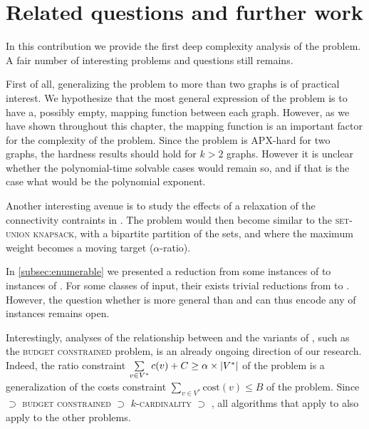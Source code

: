 	\section{Related questions and further work}

		In this contribution we provide the first deep complexity analysis of the \mwccs{} problem.
		A fair number of interesting problems and questions still remains.

		First of all, generalizing the problem to more than two graphs is of practical interest.
		We hypothesize that the most general expression of the problem is to have a, possibly empty, mapping function between each graph.
		However, as we have shown throughout this chapter, the mapping function is an important factor for the complexity of the problem.
		Since the \mwccs{} problem is APX-hard for two graphs, the hardness results should hold for $k > 2$ graphs.
		However it is unclear whether the polynomial-time solvable cases would remain so, and if that is the case what would be the polynomial exponent.

		Another interesting avenue is to study the effects of a relaxation of the connectivity contraints in \mwccs{}.
		The problem would then become similar to the \textsc{set-union knapsack}, with a bipartite partition of the sets, and where the maximum weight becomes a moving target ($\alpha$-ratio).

		In \cref{subsec:enumerable} we presented a reduction from some instances of \mwccs{} to instances of \rbmwcs{}.
		For some classes of input, their exists trivial reductions from \rbmwcs{} to \mwccs{}.
		However, the question whether \mwccs{} is more general than \rbmwcs{} and can thus encode any of \rbmwcs{} instances remains open.

		Interestingly, analyses of the relationship between \rbmwcs{} and the variants of \mwcs{}, such as the \textsc{budget constrained} problem, is an already ongoing direction of our research.
		Indeed, the ratio constraint $\sum\limits_{v \in V^*}{c(v)} + C \geq \alpha\times\lvert V^*\rvert$ of the \rbmwcs{} problem is a generalization of the costs constraint $\sum\limits_{v \in V^*}{\text{cost}(v)} \leq B$ of the \bcmwcs{} problem. %
		Since \rbmwcs{} $\supset$ \textsc{budget constrained \mwcs{}} $\supset$ \textsc{$k$-cardinality \mwcs{}} $\supset$ \mwcs{}, all algorithms that apply to \rbmwcs{} also apply to the other problems.

